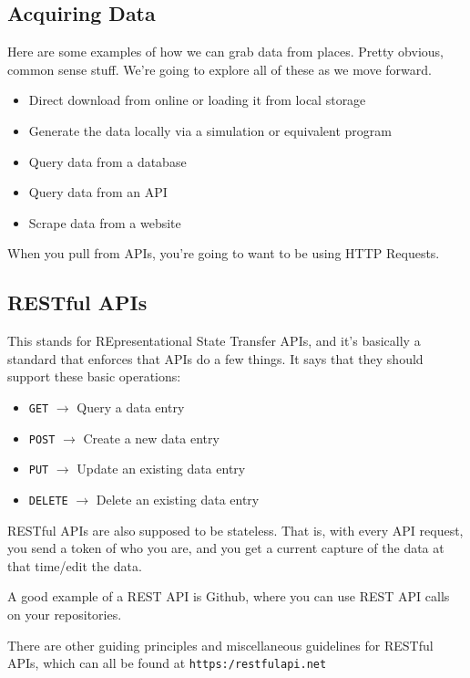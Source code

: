 \documentclass[english, 10pt]{article}
\begin{document}
\subsection{Acquiring Data}

Here are some examples of how we can grab data from places. Pretty obvious, common sense stuff. We're going to explore all of these as we move forward.

\begin{itemize}
	\item Direct download from online or loading it from local storage
	\item Generate the data locally via a simulation or equivalent program
	\item Query data from a database 
	\item Query data from an API
	\item Scrape data from a website
\end{itemize}

When you pull from APIs, you're going to want to be using HTTP Requests.

\subsection{RESTful APIs}

This stands for REpresentational State Transfer APIs, and it's basically a standard that enforces that APIs do a few things. It says that they should support these basic operations:

\begin{itemize}
	\item \texttt{GET} $\rightarrow$ Query a data entry
	\item \texttt{POST} $\rightarrow$ Create a new data entry
	\item \texttt{PUT} $\rightarrow$ Update an existing data entry
	\item \texttt{DELETE} $\rightarrow$ Delete an existing data entry
\end{itemize}

RESTful APIs are also supposed to be stateless. That is, with every API request, you send a token of who you are, and you get a current capture of the data at that time/edit the data.\newline

A good example of a REST API is Github, where you can use REST API calls on your repositories.\newline

There are other guiding principles and miscellaneous guidelines for RESTful APIs, which can all be found at \texttt{https:/restfulapi.net}\newline
\end{document}
